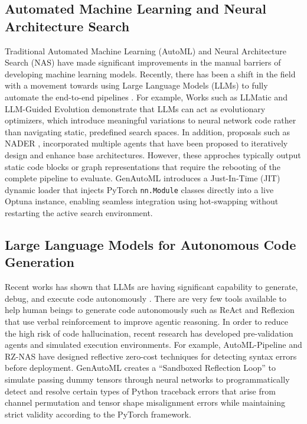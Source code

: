 \documentclass{article}
\begin{document}
\subsection{Automated Machine Learning and Neural Architecture Search}
Traditional Automated Machine Learning (AutoML) \cite{hutter2019automated} and Neural Architecture Search (NAS) \cite{elsken2019neural} have made significant improvements in the manual barriers of developing machine learning models. Recently, there has been a shift in the field with a movement towards using Large Language Models (LLMs) to fully automate the end-to-end pipelines \cite{llm_end_to_end, llm2automl, automl_agent, uniautoml}. For example, Works such as LLMatic \cite{llmatic} and LLM-Guided Evolution \cite{llm_guided_evo} demonstrate that LLMs can act as evolutionary optimizers, which introduce meaningful variations to neural network code rather than navigating static, predefined search spaces. In addition, proposals such as NADER \cite{nader}, incorporated multiple agents that have been proposed to iteratively design and enhance base architectures. However, these approches typically output static code blocks or graph representations that require the rebooting of the complete pipeline to evaluate. GenAutoML introduces a Just-In-Time (JIT) dynamic loader that injects PyTorch \texttt{nn.Module} classes directly into a live Optuna instance, enabling seamless integration using hot-swapping without restarting the active search environment.

\subsection{Large Language Models for Autonomous Code Generation}
Recent works has shown that LLMs are having significant capability to generate, debug, and execute code autonomously \cite{roziere2023code, lei2024autocoder}. There are very few tools available to help human beings to generate code autonomously such as ReAct \cite{yao2022react} and Reflexion \cite{shinn2023reflexion}  that use verbal reinforcement to improve agentic reasoning. In order to reduce the high risk of code hallucination, recent research has developed pre-validation agents and simulated execution environments. For example, AutoML-Pipeline \cite{automl_pipeline} and RZ-NAS \cite{rz_nas} have designed reflective zero-cost techniques for detecting syntax errors before deployment. GenAutoML creates a “Sandboxed Reflection Loop” to simulate passing dummy tensors through neural networks to programmatically detect and resolve certain types of Python traceback errors that arise from channel permutation and tensor shape misalignment errors while maintaining strict validity according to the PyTorch framework.
\end{document}
